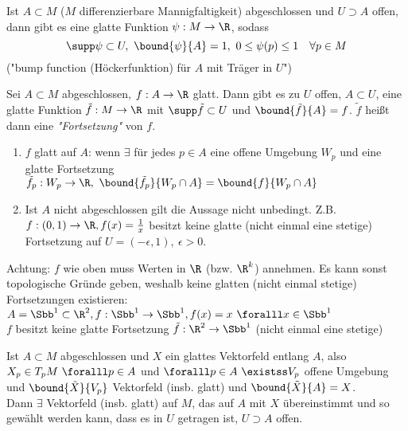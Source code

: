 \lecture
\begin{lem}
	Ist $ A \subset M $ ($M$ differenzierbare Mannigfaltigkeit) abgeschlossen und $U \supset A$ offen, dann gibt es eine glatte Funktion $\psi: M \to \R$, sodass
	\[ \supp \psi \subset U,\ \bound{\psi}{A} = 1,\ 0 \leq \psi(p) \leq 1 \quad \forall p \in M \]
	("bump function (Höckerfunktion) für $A$ mit Träger in $U$")
\end{lem}

\begin{lem}
	Sei $A \subset M$ abgeschlossen, $ f: A \to \R $ glatt. Dann gibt es zu $U$ offen, $A \subset U$, eine glatte Funktion $\tilde{f}: M \to \R$ mit $ \supp \tilde{f} \subset U $ und $ \bound{\tilde{f}}{A} = f $. $\tilde{f}$ heißt dann eine \emph{"Fortsetzung"} von $f$.
\end{lem}

\begin{rem*}
	\begin{enumerate}[label={\roman*})]
		\item $f$ glatt auf $A$: wenn $\exists$ für jedes $p \in A$ eine offene Umgebung $W_p$ und eine glatte Fortsetzung $ \tilde{f}_p: W_p \to \R,\ \bound{\tilde{f}_p}{W_p \cap A} = \bound{f}{W_p\cap A} $
		\item Ist $A$ nicht abgeschlossen gilt die Aussage nicht unbedingt. Z.B. $ f:(0,1) \to \R, f(x) = \frac{1}{x} $ besitzt keine glatte (nicht einmal eine stetige) Fortsetzung auf $U = (-\epsilon,1),\ \epsilon > 0$.
	\end{enumerate}
\end{rem*}

\begin{rem*}
	Achtung: $f$ wie oben muss Werten in $\R$ (bzw. $\R^k$) annehmen. Es kann sonst topologische Gründe geben, weshalb keine glatten (nicht einmal stetige) Fortsetzungen existieren:\\
	$ A = \Sbb^1 \subset \R^2, f: \Sbb^1 \to \Sbb^1, f(x) = x \ \foralll x \in \Sbb^1 $\\
	$f$ besitzt keine glatte Fortsetzung $ \tilde{f}: \R^2 \to \Sbb^1 $ (nicht einmal eine stetige)
\end{rem*}

\begin{lem}
	Ist $ A \subset M $ abgeschlossen und $X$ ein glattes Vektorfeld entlang $A$, also $ X_p \in T_pM \ \foralll p \in A $ und $\foralll p \in A \ \existss V_p$ offene Umgebung und $ \bound{\tilde{X}}{V_p} $ Vektorfeld (insb. glatt) und $\bound{\tilde{X}}{A} = X$.\\
	Dann $\exists$ Vektorfeld (insb. glatt) auf $M$, das auf $A$ mit $X$ übereinstimmt und so gewählt werden kann, dass es in $U$ getragen ist, $U \supset A$ offen.
\end{lem}